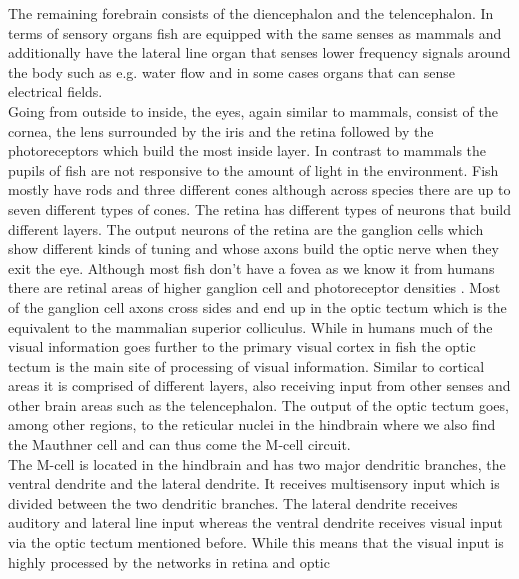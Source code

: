 \documentclass[a4paper,10pt,hidelinks]{scrreprt}
\begin{document}
	The remaining forebrain consists of the diencephalon and the telencephalon.
	In terms of sensory organs fish are equipped with the same senses as mammals and additionally 
	have the lateral line organ that senses lower frequency signals around the body such as e.g. 
	water flow and in some cases organs that can sense electrical fields.\\
	Going from outside to inside, the eyes, again similar to mammals, consist of the cornea, the 
	lens surrounded by the iris and the retina followed by the photoreceptors which build the most 
	inside layer.
	In contrast to mammals the pupils of fish are not responsive to the amount of light in the 
	environment.
	Fish mostly have rods and three different cones although across species there are up to seven 
	different types of cones.
	The retina has different types of neurons that build different layers.
	The output neurons of the retina are the ganglion cells which show different kinds of tuning 
	and whose axons build the optic nerve when they exit the eye.
	Although most fish don't have a fovea as we know it from humans there are retinal areas of 
	higher ganglion cell and photoreceptor densities \citep{Pita2015}.
	Most of the ganglion cell axons cross sides and end up in the optic tectum which is the 
	equivalent to the mammalian superior colliculus.
	While in humans much of the visual information goes further to the primary visual cortex in 
	fish the optic tectum is the main site of processing of visual information.
	Similar to cortical areas it is comprised of different layers, also receiving input from other 
	senses and other brain areas such as the telencephalon.
	The output of the optic tectum goes, among other regions, to the reticular nuclei in the 
	hindbrain where we also find the Mauthner cell and can thus come the M-cell circuit.\\
	The M-cell is located in the hindbrain and has two major dendritic branches, the ventral 
	dendrite and the lateral dendrite.
	It receives multisensory input which is divided between the two dendritic branches.
	The lateral dendrite receives auditory and lateral line input whereas the ventral dendrite 
	receives visual input via the optic tectum mentioned before.
	While this means that the visual input is highly processed by the networks in retina and optic 
\end{document}
